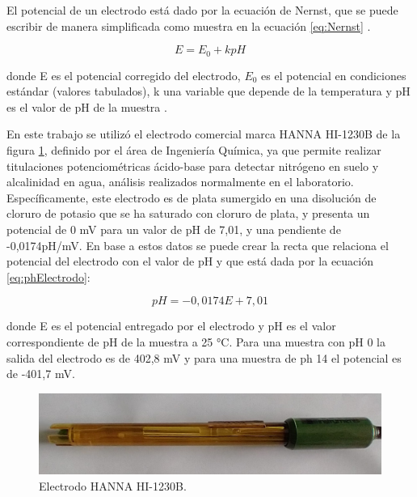 
El potencial de un electrodo está dado por la ecuación de Nernst, que se puede
escribir de manera simplificada como muestra en la ecuación \ref{eq:Nernst} .

\begin{equation}
	\label{eq:Nernst}
E = E_{0} + k pH 
\end{equation}


donde E es el potencial corregido del electrodo, $E_{0}$ es el potencial en condiciones estándar (valores tabulados), k una variable que depende de la temperatura y pH es el valor de pH de la muestra \citep{ARTICLE:4}.

En este trabajo se utilizó el electrodo comercial marca HANNA HI-1230B de la figura \ref{fig:hi-1230b}, definido por el área de Ingeniería Química, ya que permite realizar titulaciones potenciométricas ácido-base para detectar nitrógeno en suelo y alcalinidad en agua, análisis realizados normalmente en el laboratorio. Específicamente, este electrodo es de plata sumergido en una disolución de cloruro de potasio que se ha saturado con cloruro de plata, y presenta un potencial de 0 mV para un valor de pH de 7,01, y una pendiente de -0,0174pH/mV. En base a estos datos se puede crear la recta que relaciona el potencial del electrodo con el valor de pH y que está dada por la ecuación \ref{eq:phElectrodo}:

\begin{equation}
	\label{eq:phElectrodo}
pH = -0,0174 E + 7,01
\end{equation}

donde E es el potencial entregado por el electrodo y pH es el valor correspondiente de pH de la muestra a 25 °C. Para una muestra con pH 0 la salida del electrodo es de 402,8 mV y para una muestra de ph 14 el potencial es de -401,7 mV.

\begin{figure}[htbp]
	\centering
	\includegraphics[width=1.0\textwidth]{./Figures/hi-1230b.jpeg}
	\caption{Electrodo HANNA HI-1230B.}
	\label{fig:hi-1230b}
\end{figure}


